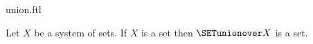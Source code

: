 \documentclass{stex}
\begin{document}
\begin{smodule}{union.ftl}


\begin{axiom}[forthel,title=Union,name=Union Axiom]
  Let $X$ be a system of sets.
  If $X$ is a set then $\SETunionover X$ is a set.
\end{axiom}
\end{smodule}
\end{document}
